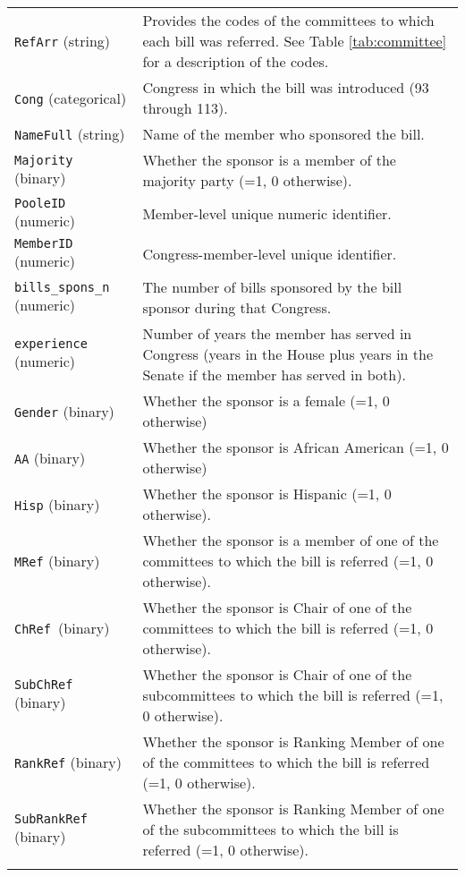 \documentclass[10pt,a4paper]{article}
\begin{document}
\begin{table}[!h]
\begin{tabular}{lL{12cm}}
\texttt{RefArr} (string) & Provides the codes of the committees to which each bill was referred. See Table \ref{tab:committee} for a description of the codes.\\
\texttt{Cong}	(categorical) & Congress in which the bill was introduced (93 through 113). \\
\texttt{NameFull}	(string) & Name of the member who sponsored the bill. \\
\texttt{Majority}	(binary) & Whether the sponsor is a member of the majority party (=1, 0 otherwise). \\
\texttt{PooleID} (numeric) & Member-level unique numeric identifier. \\
\texttt{MemberID} (numeric) & Congress-member-level unique identifier. \\
\texttt{bills\_spons\_n} (numeric) & The number of bills sponsored by the bill sponsor during that Congress. \\
\texttt{experience} (numeric) & Number of years the member has served in Congress (years in the House plus years in the Senate if the member has served in both).\\
\texttt{Gender} (binary) & Whether the sponsor is a female (=1, 0 otherwise) \\
\texttt{AA}  (binary) & Whether the sponsor is African American (=1, 0 otherwise) \\
\texttt{Hisp} (binary) & Whether the sponsor is Hispanic (=1, 0 otherwise).\\
\texttt{MRef}	(binary) & Whether the sponsor is a member of one of the committees to which the bill is referred (=1, 0 otherwise). \\
\texttt{ChRef	}(binary) & Whether the sponsor is Chair of one of the committees to which the bill is referred (=1, 0 otherwise). \\
\texttt{SubChRef}	(binary) &  Whether the sponsor is Chair of one of the subcommittees to which the bill is referred (=1, 0 otherwise). \\
\texttt{RankRef} (binary) & Whether the sponsor is Ranking Member of one of the committees to which the bill is referred (=1, 0 otherwise). \\
\texttt{SubRankRef}	(binary) & Whether the sponsor is Ranking Member of one of the subcommittees to which the bill is referred (=1, 0 otherwise). \\

\end{tabular}
\end{table}
\end{document}

